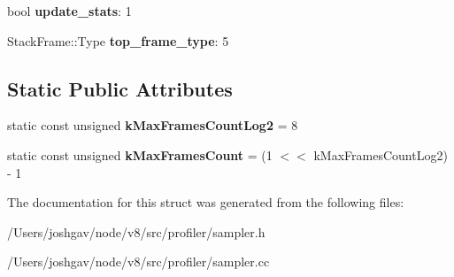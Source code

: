 \begin{DoxyCompactItemize}
\item 
bool {\bfseries update\+\_\+stats}\+: 1\hypertarget{structv8_1_1internal_1_1_tick_sample_aa99a5c254f54571906945a72d7226ac9}{}\label{structv8_1_1internal_1_1_tick_sample_aa99a5c254f54571906945a72d7226ac9}

\item 
Stack\+Frame\+::\+Type {\bfseries top\+\_\+frame\+\_\+type}\+: 5\hypertarget{structv8_1_1internal_1_1_tick_sample_a3be24a623a54a910808059ea4af16de7}{}\label{structv8_1_1internal_1_1_tick_sample_a3be24a623a54a910808059ea4af16de7}

\end{DoxyCompactItemize}
\subsection*{Static Public Attributes}
\begin{DoxyCompactItemize}
\item 
static const unsigned {\bfseries k\+Max\+Frames\+Count\+Log2} = 8\hypertarget{structv8_1_1internal_1_1_tick_sample_a1e37b1a4cc6b4f1e66d511164e141fb4}{}\label{structv8_1_1internal_1_1_tick_sample_a1e37b1a4cc6b4f1e66d511164e141fb4}

\item 
static const unsigned {\bfseries k\+Max\+Frames\+Count} = (1 $<$$<$ k\+Max\+Frames\+Count\+Log2) -\/ 1\hypertarget{structv8_1_1internal_1_1_tick_sample_afa87acb650029f445faeaa7536e2cd8f}{}\label{structv8_1_1internal_1_1_tick_sample_afa87acb650029f445faeaa7536e2cd8f}

\end{DoxyCompactItemize}


The documentation for this struct was generated from the following files\+:\begin{DoxyCompactItemize}
\item 
/\+Users/joshgav/node/v8/src/profiler/sampler.\+h\item 
/\+Users/joshgav/node/v8/src/profiler/sampler.\+cc\end{DoxyCompactItemize}
